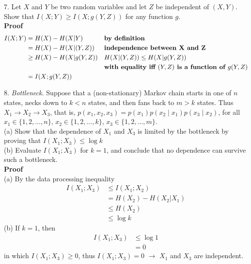 \documentclass[12pt]{article}
\begin{document}
	\par 
	7. Let $X$ and $Y$ be two random variables and let $Z$ be independent of $(X,Y)$. Show that $I(X;Y)\geq I(X;g(Y,Z))$ for any function $g$. \\
	\textbf{Proof} 
	\begin{align*}
		I(X;Y) &= H(X) - H(X{\mid}Y) && \text{\textbf{by definition}}\\
			   &= H(X) - H(X{\mid}(Y,Z)) && \text{\textbf{independence between X and Z}}\\
			   &\geq H(X) - H(X{\mid}g(Y,Z)) && \text{\textbf{$H(X{\mid}(Y,Z))\leq H(X{\mid}g(Y,Z))$}} \\
			   & &&\text{\textbf{with equality iff $(Y,Z)$ is a function of $g(Y,Z)$}} \\
			   &= I(X;g(Y,Z)) \\
	\end{align*}
	
	\par 
	8. \textit{Bottleneck.} Suppose that a (non-stationary) Markov chain starts in one of $n$ states, necks down to $k<n$ states, and then fans back to $m>k$ states. Thus $X_1\rightarrow X_2\rightarrow X_3$, that is, $p(x_1,x_2,x_3) = p(x_1)p(x_2{\mid}x_1)p(x_3{\mid}x_2)$, for all $x_1\in\{1,2,...,n\}$, $x_2\in\{1,2,...,k\}$, $x_3\in\{1,2,...,m\}$. \\
	(a) Show that the dependence of $X_1$ and $X_3$ is limited by the bottleneck by proving that $I(X_1;X_3)\leq \log k$ \\
	(b) Evaluate $I(X_1;X_3)$ for $k=1$, and conclude that no dependence can survive such a bottleneck.\\
	\textbf{Proof}\\
	(a) By the data processing inequality
	\begin{align*}
		I(X_1;X_3) &\leq I(X_1;X_2) \\
				   &= H(X_2) - H(X_2|X_1) \\
				   &\leq H(X_2) \\
				   &\leq \log k
	\end{align*}
	(b) If $k = 1$, then
	\begin{align*}
		I(X_1;X_3) &\leq \log1 \\
		           &= 0
	\end{align*}
	in which $I(X_1;X_3)\geq0$, thus $I(X_1;X_3) = 0$ $\rightarrow$ $X_1$ and $X_3$ are independent.
\end{document}
